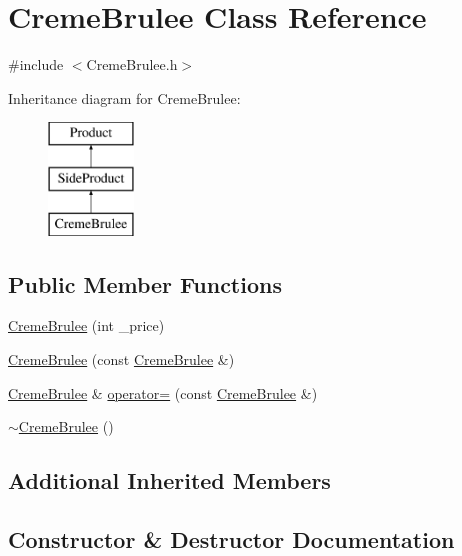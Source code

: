 \hypertarget{classCremeBrulee}{}\section{Creme\+Brulee Class Reference}
\label{classCremeBrulee}


{\ttfamily \#include $<$Creme\+Brulee.\+h$>$}

Inheritance diagram for Creme\+Brulee\+:\begin{figure}[H]
\begin{center}
\leavevmode
\includegraphics[height=3.000000cm]{classCremeBrulee}
\end{center}
\end{figure}
\subsection*{Public Member Functions}
\begin{DoxyCompactItemize}
\item 
\mbox{\hyperlink{classCremeBrulee_ae5d8a58a1aaeedb15579399708361948}{Creme\+Brulee}} (int \+\_\+price)
\item 
\mbox{\hyperlink{classCremeBrulee_a4dc602826d91ee2ec968a25564fd650d}{Creme\+Brulee}} (const \mbox{\hyperlink{classCremeBrulee}{Creme\+Brulee}} \&)
\item 
\mbox{\hyperlink{classCremeBrulee}{Creme\+Brulee}} \& \mbox{\hyperlink{classCremeBrulee_aa1b2e48f56c6cb0efe5a905a77c2e74d}{operator=}} (const \mbox{\hyperlink{classCremeBrulee}{Creme\+Brulee}} \&)
\item 
\mbox{\hyperlink{classCremeBrulee_af94661af8aa10067b6358d4beb94cf70}{$\sim$\+Creme\+Brulee}} ()
\end{DoxyCompactItemize}
\subsection*{Additional Inherited Members}


\subsection{Constructor \& Destructor Documentation}
\mbox{\label{classCremeBrulee_ae5d8a58a1aaeedb15579399708361948}} 
